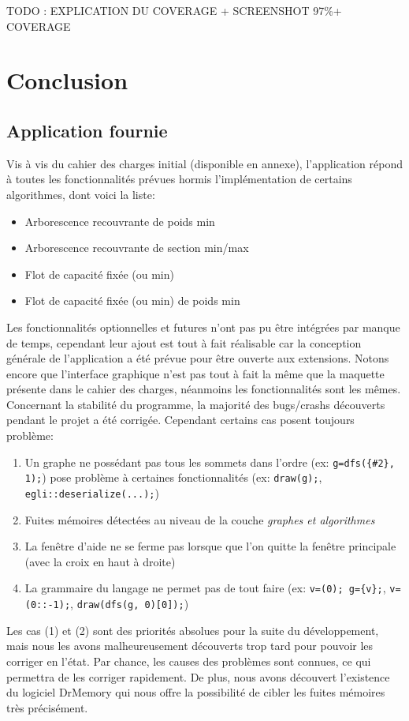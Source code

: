 \documentclass[french]{article}
\begin{document}
	TODO : EXPLICATION DU COVERAGE + SCREENSHOT 97\%+ COVERAGE
	
		\section{Conclusion}
		
		\subsection{Application fournie}			
		Vis à vis du cahier des charges initial (disponible en annexe), l'application répond à toutes les fonctionnalités prévues hormis l'implémentation de certains algorithmes, dont voici la liste:
		\begin{itemize}
			\item Arborescence recouvrante de poids min
			\item Arborescence recouvrante de section min/max
			\item Flot de capacité fixée (ou min)
			\item Flot de capacité fixée (ou min) de poids min
		\end{itemize}
		Les fonctionnalités optionnelles et futures n'ont pas pu être intégrées par manque de temps, cependant leur ajout est tout à fait réalisable car la conception générale de l'application a été prévue pour être ouverte aux extensions. Notons encore que l'interface graphique n'est pas tout à fait la même que la maquette présente dans le cahier des charges, néanmoins les fonctionnalités sont les mêmes.\\
		
		Concernant la stabilité du programme, la majorité des bugs/crashs découverts pendant le projet a été corrigée. Cependant certains cas posent toujours problème:
		\begin{enumerate}
			\item Un graphe ne possédant pas tous les sommets dans l'ordre (ex: \texttt{g=dfs(\{\#2\}, 1);}) pose problème à certaines fonctionnalités (ex: \texttt{draw(g);}, \texttt{egli::deserialize(...);})
			\item Fuites mémoires détectées au niveau de la couche \textit{graphes et algorithmes}
			\item La fenêtre d'aide ne se ferme pas lorsque que l'on quitte la fenêtre principale (avec la croix en haut à droite)
			\item La grammaire du langage ne permet pas de tout faire (ex: \texttt{v=(0); g=\{v\};}, \texttt{v=(0::-1);}, \texttt{draw(dfs(g, 0)[0]);})
		\end{enumerate}
		Les cas (1) et (2) sont des priorités absolues pour la suite du développement, mais nous les avons malheureusement découverts trop tard pour pouvoir les corriger en l'état. Par chance, les causes des problèmes sont connues, ce qui permettra de les corriger rapidement. De plus, nous avons découvert l'existence du logiciel DrMemory \cite{drmemory} qui nous offre la possibilité de cibler les fuites mémoires très précisément.\\
		
\end{document}
